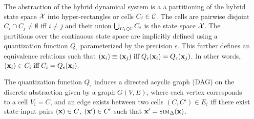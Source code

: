 

The abstraction of the hybrid dynamical system is a a
partitioning of the hybrid state space $\mathcal{X}$ into hyper-rectangles or cells $C_i \in \mathcal{C}$. The cells are
pairwise disjoint $C_i \cap C_j \neq \emptyset$ iff $i \neq j$ and
their union $\bigcup_{C_i\in\mathcal{C}}C_i$ is the state space $\mathcal{X}$. The partitions over
the continuous state space are implicitly defined using a quantization
function $Q_\epsilon$ parameterized by the precision $\epsilon$.
This further defines an equivalence relations such that $(\mathbf{x}_i)
\equiv (\mathbf{x}_j) \;\text{iff}\; Q_\epsilon(\mathbf{x}_i) = Q_\epsilon(\mathbf{x}_j)$.
In other words, $(\mathbf{x}_i) \in C_i \; \text{iff} \; C_i = Q_\epsilon(\mathbf{x}_i)$.

\begin{definition}
    The quantization function $Q_\epsilon$ induces a directed acyclic
    graph (DAG) on the discrete
    abstraction given by a graph $G(V, E)$, where each vertex
    corresponds to a cell $V_i = C$, and an edge exists between two
    cells $(C, C') \in E_i$ iff there exist state-input pairs
    $(\mathbf{x}) \in C$, $(\mathbf{x}') \in C'$ such that $\mathbf{x}' =
    \mbox{\sc sim}_\Delta(\mathbf{x})$.
\end{definition}




